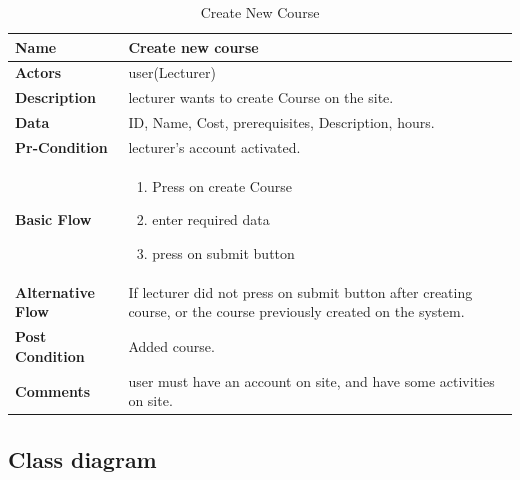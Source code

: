 \documentclass[../Psychological_system_web_application.tex]{subfiles}
\begin{document}
	\begin{center}
		\begin{table}[h!]
			\begin{tabular}{ | m{4cm} | m{10cm}| } 
				\hline
			 	\textbf{\large Name}& Create new course\\ 
				\hline
			  	\textbf{\large Actors}& user(Lecturer)\\ 
				\hline
			  	\textbf{\large Description}& lecturer  wants to create Course on the site.\\ 
				\hline
				\textbf{\large Data}& ID, Name, Cost, prerequisites, Description, hours.\\ 
				\hline
				 \textbf{\large Pr-Condition}& lecturer's account activated. \\ 
				\hline
				\textbf{\large Basic Flow}&\begin{enumerate}
				\item
					Press on create Course
				\item
					enter required data
				\item
					press on submit button \end{enumerate}\\
					\hline
				\textbf{\large Alternative Flow}& If lecturer did not press on submit button after creating course, or the course previously created on the system.\\ 
				\hline
				\textbf{\large Post Condition}& Added course.\\ 
				\hline
				\textbf{\large Comments}& user must have an account on site, and have some activities on site.\\ 
				\hline
			\end{tabular}
			\caption{Create New Course}
			\label{table:CREATE-COURSE}
		\end{table}
	\end{center}
	
	\clearpage
					\subsection{Class diagram}
\end{document}
